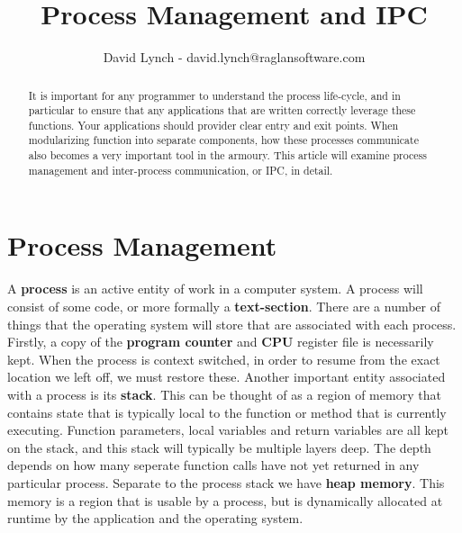 \documentclass[10pt,a4paper]{article}
\title{Process Management and IPC}
\author{David Lynch - david.lynch@raglansoftware.com }
\begin{document}
\maketitle
\begin{abstract}
It is important for any programmer to understand the process life-cycle, and in particular to ensure that any applications that are written correctly leverage these functions. Your applications should  provider clear entry and exit points. When modularizing function into separate components, how these processes communicate also becomes a very important tool in the armoury. This article will examine process management and inter-process communication, or IPC, in detail.
\end{abstract}
\section{Process Management}
A {\bf process} is an active entity of work in a computer system. A process will consist of some code, or more formally a {\bf text-section}. There are a number of things that the operating system will store that are associated with each process. Firstly, a copy of the {\bf program counter} and {\bf CPU} register file is necessarily kept. When the process is context switched, in order to resume from the exact location we left off, we must restore these. Another important entity associated with a process is its {\bf stack}. This can be thought of as a region of memory that contains state that is typically local to the function or method that is currently executing. Function parameters, local variables and return variables are all kept on the stack, and this stack will typically be multiple layers deep. The depth depends on how many seperate function calls have not yet returned in any particular process. Separate to the process stack we have {\bf heap memory}. This memory is a region that is usable by a process, but is dynamically allocated at runtime by the application and the operating system.
\end{document}
